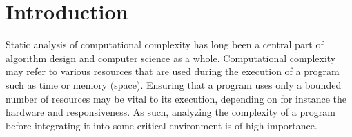 %   

%
\chapter{Introduction}\label{ch:introduction}
Static analysis of computational complexity has long been a central part of algorithm design and computer science as a whole. Computational complexity may refer to various resources that are used during the execution of a program such as time or memory (space). Ensuring that a program uses only a bounded number of resources may be vital to its execution, depending on for instance the hardware and responsiveness. As such, analyzing the complexity of a program before integrating it into some critical environment is of high importance. 

